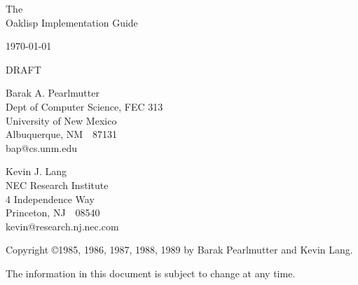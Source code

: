 \begin{titlepage}

\begin{center}

\vspace*{1in}

\Huge
 The \\
 Oaklisp Implementation Guide \\

\vspace{.5in}

\large
 \today \\

\vspace{.25in}

\Huge
 DRAFT \\

\vspace{.5in}

\Large
 Barak A. Pearlmutter \\
\large
 Dept of Computer Science, FEC 313\\
 University of New Mexico\\
 Albuquerque, NM~~87131\\
 bap@cs.unm.edu\\

\vspace{.5in}

\Large
 Kevin J. Lang \\
\large
 NEC Research Institute \\
 4 Independence Way \\
 Princeton, NJ~~08540 \\
 kevin@research.nj.nec.com

\vfill

\normalsize
 Copyright \copyright 1985, 1986, 1987, 1988, 1989
 by Barak Pearlmutter and Kevin Lang.

\vspace{0.25in}

 The information in this document is subject to change at any time.

\end{center}

\end{titlepage}
